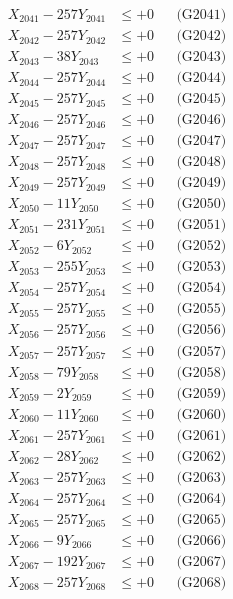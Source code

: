 \documentclass[a4paper,10pt]{article}
\begin{document}
{\begin{align}
\allowbreak
X_{2041} - 257Y_{2041} &\leq +0 && \text{(G2041)} \\
X_{2042} - 257Y_{2042} &\leq +0 && \text{(G2042)} \\
X_{2043} - 38Y_{2043} &\leq +0 && \text{(G2043)} \\
X_{2044} - 257Y_{2044} &\leq +0 && \text{(G2044)} \\
X_{2045} - 257Y_{2045} &\leq +0 && \text{(G2045)} \\
X_{2046} - 257Y_{2046} &\leq +0 && \text{(G2046)} \\
X_{2047} - 257Y_{2047} &\leq +0 && \text{(G2047)} \\
X_{2048} - 257Y_{2048} &\leq +0 && \text{(G2048)} \\
X_{2049} - 257Y_{2049} &\leq +0 && \text{(G2049)} \\
X_{2050} - 11Y_{2050} &\leq +0 && \text{(G2050)} \\
\allowbreak
X_{2051} - 231Y_{2051} &\leq +0 && \text{(G2051)} \\
X_{2052} - 6Y_{2052} &\leq +0 && \text{(G2052)} \\
X_{2053} - 255Y_{2053} &\leq +0 && \text{(G2053)} \\
X_{2054} - 257Y_{2054} &\leq +0 && \text{(G2054)} \\
X_{2055} - 257Y_{2055} &\leq +0 && \text{(G2055)} \\
X_{2056} - 257Y_{2056} &\leq +0 && \text{(G2056)} \\
X_{2057} - 257Y_{2057} &\leq +0 && \text{(G2057)} \\
X_{2058} - 79Y_{2058} &\leq +0 && \text{(G2058)} \\
X_{2059} - 2Y_{2059} &\leq +0 && \text{(G2059)} \\
X_{2060} - 11Y_{2060} &\leq +0 && \text{(G2060)} \\
\allowbreak
X_{2061} - 257Y_{2061} &\leq +0 && \text{(G2061)} \\
X_{2062} - 28Y_{2062} &\leq +0 && \text{(G2062)} \\
X_{2063} - 257Y_{2063} &\leq +0 && \text{(G2063)} \\
X_{2064} - 257Y_{2064} &\leq +0 && \text{(G2064)} \\
X_{2065} - 257Y_{2065} &\leq +0 && \text{(G2065)} \\
X_{2066} - 9Y_{2066} &\leq +0 && \text{(G2066)} \\
X_{2067} - 192Y_{2067} &\leq +0 && \text{(G2067)} \\
X_{2068} - 257Y_{2068} &\leq +0 && \text{(G2068)} \\

\end{align}}
\end{document}
